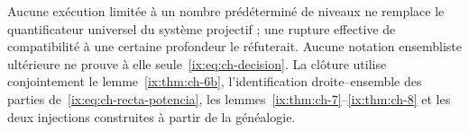 Aucune exécution limitée à un nombre prédéterminé de niveaux ne remplace le quantificateur universel du système projectif ; une rupture effective de compatibilité à une certaine profondeur le réfuterait. Aucune notation ensembliste ultérieure ne prouve à elle seule~\eqref{ix:eq:ch-decision}. La clôture utilise conjointement le lemme~\ref{ix:thm:ch-6b}, l'identification droite--ensemble des parties de~\eqref{ix:eq:ch-recta-potencia}, les lemmes~\ref{ix:thm:ch-7}--\ref{ix:thm:ch-8} et les deux injections construites à partir de la généalogie.
